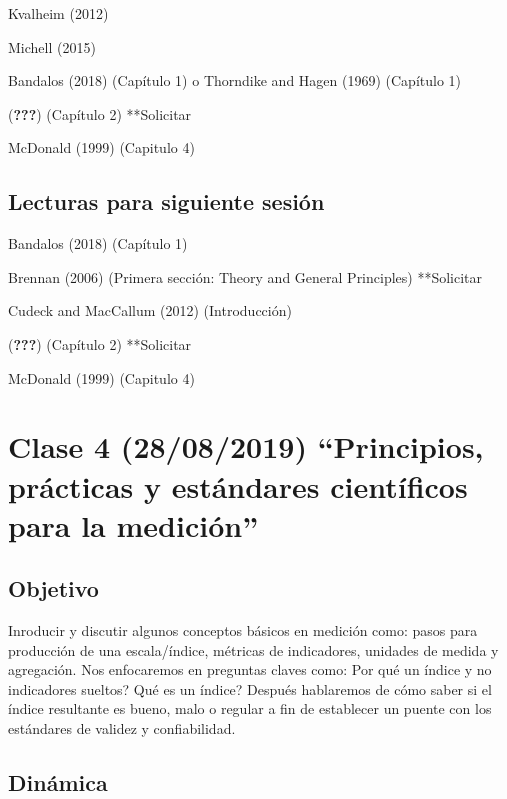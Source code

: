 \documentclass[11pt,]{article}
\begin{document}
Kvalheim (2012)

Michell (2015)

Bandalos (2018) (Capítulo 1) o Thorndike and Hagen (1969) (Capítulo 1)

({\textbf{???}}) (Capítulo 2) **Solicitar

McDonald (1999) (Capitulo 4)

\hypertarget{lecturas-para-siguiente-sesion-1}{%
\subsection{Lecturas para siguiente
sesión}\label{lecturas-para-siguiente-sesion-1}}

Bandalos (2018) (Capítulo 1)

Brennan (2006) (Primera sección: Theory and General Principles)
**Solicitar

Cudeck and MacCallum (2012) (Introducción)

({\textbf{???}}) (Capítulo 2) **Solicitar

McDonald (1999) (Capitulo 4)

\hypertarget{clase-4-28082019-principios-practicas-y-estandares-cientificos-para-la-medicion}{%
\section{Clase 4 (28/08/2019) ``Principios, prácticas y estándares
científicos para la
medición''}\label{clase-4-28082019-principios-practicas-y-estandares-cientificos-para-la-medicion}}

\hypertarget{objetivo-3}{%
\subsection{Objetivo}\label{objetivo-3}}

Inroducir y discutir algunos conceptos básicos en medición como: pasos
para producción de una escala/índice, métricas de indicadores, unidades
de medida y agregación. Nos enfocaremos en preguntas claves como: Por
qué un índice y no indicadores sueltos? Qué es un índice? Después
hablaremos de cómo saber si el índice resultante es bueno, malo o
regular a fin de establecer un puente con los estándares de validez y
confiabilidad.

\hypertarget{dinamica-3}{%
\subsection{Dinámica}\label{dinamica-3}}
\end{document}
